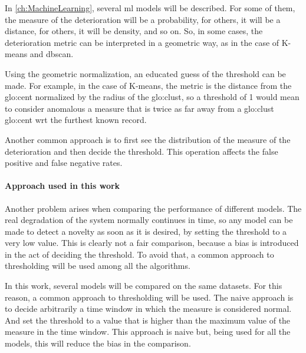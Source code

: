 In \autoref{ch:MachineLearning}, several \gls{ml} models will be described. For some of them, the measure of the deterioration will be a probability, for others, it will be a distance, for others, it will be density, and so on. So, in some cases, the deterioration metric can be interpreted in a geometric way, as in the case of K-means and \gls{dbscan}.

Using the geometric normalization, an educated guess of the threshold can be made. For example, in the case of K-means, the metric is the distance from the \gls{glo:cent} normalized by the radius of the \gls{glo:clust}, so a threshold of 1 would mean to consider anomalous a measure that is twice as far away from a \gls{glo:clust} \gls{glo:cent} \gls{wrt} the furthest known record.

Another common approach is to first see the distribution of the measure of the deterioration and then decide the threshold. This operation affects the false positive and false negative rates.

\paragraph{Approach used in this work}

Another problem arises when comparing the performance of different models. The real degradation of the system normally continues in time, so any model can be made to detect a novelty as soon as it is desired, by setting the threshold to a very low value. This is clearly not a fair comparison, because a bias is introduced in the act of deciding the threshold. To avoid that, a common approach to thresholding will be used among all the algorithms.

In this work, several models will be compared on the same datasets. For this reason, a common approach to thresholding will be used. The naive approach is to decide arbitrarily a time window in which the measure is considered normal. And set the threshold to a value that is higher than the maximum value of the measure in the time window. This approach is naive but, being used for all the models, this will reduce the bias in the comparison.